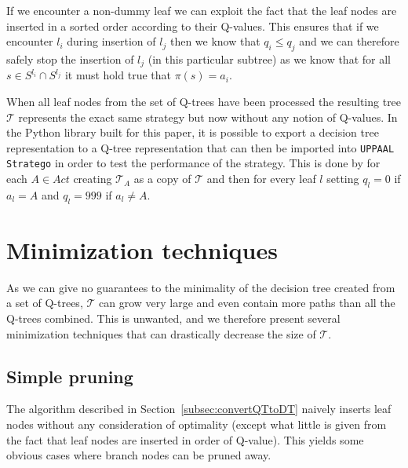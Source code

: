 If we encounter a non-dummy leaf we can exploit the fact that the leaf nodes are
inserted in a sorted order according to their Q-values. This ensures that if we
encounter $l_i$ during insertion of $l_j$ then we know that $q_i \le  q_j$ and
we can therefore safely stop the insertion of $l_j$ (in this particular subtree)
as we know that for all $s \in S^{l_i} \cap S^{l_j}$ it must hold true that
$\pi(s) = a_i$.

When all leaf nodes from the set of Q-trees have been processed the resulting
tree $\mathcal{T}$ represents the exact same strategy but now without any notion
of Q-values. In the Python library built for this paper, it is possible to
export a decision tree representation to a Q-tree representation that can then
be imported into \texttt{UPPAAL Stratego} in order to test the performance of
the strategy. This is done by for each $A \in Act$ creating
$\mathcal{T}_A$ as a copy of $\mathcal{T}$ and then for every leaf $l$ setting
$q_l = 0$ if $a_l = A$ and $q_l = 999$ if $a_l \neq A$.

\section{Minimization techniques}%
\label{sec:minimization}

As we can give no guarantees to the minimality of the decision tree created from
a set of Q-trees, $\mathcal{T}$ can grow very large and even contain more paths
than all the Q-trees combined. This is unwanted, and we therefore present
several minimization techniques that can drastically decrease the size of
$\mathcal{T}$.

\subsection{Simple pruning}%
\label{sub:simplePrune}


The algorithm described in Section~\ref{subsec:convertQTtoDT} naively inserts
leaf nodes without any consideration of optimality (except what little is given
from the fact that leaf nodes are inserted in order of Q-value). This yields
some obvious cases where branch nodes can be pruned away.

